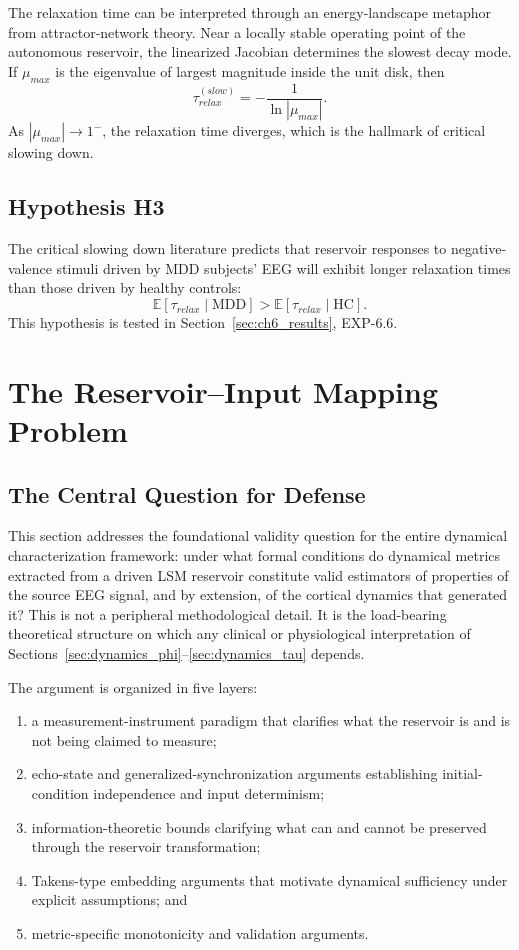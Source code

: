 The relaxation time can be interpreted through an energy-landscape metaphor from attractor-network theory. Near a locally stable operating point of the autonomous reservoir, the linearized Jacobian determines the slowest decay mode. If $\mu_{max}$ is the eigenvalue of largest magnitude inside the unit disk, then
\begin{equation}
\tau_{relax}^{(slow)} = -\frac{1}{\ln|\mu_{max}|}.
\end{equation}
As $|\mu_{max}|\rightarrow 1^{-}$, the relaxation time diverges, which is the hallmark of critical slowing down.

\subsection{Hypothesis H3}
The critical slowing down literature predicts that reservoir responses to negative-valence stimuli driven by MDD subjects' EEG will exhibit longer relaxation times than those driven by healthy controls:
\begin{equation}
\mathbb{E}[\tau_{relax}\mid \mathrm{MDD}] > \mathbb{E}[\tau_{relax}\mid \mathrm{HC}].
\end{equation}
This hypothesis is tested in Section~\ref{sec:ch6_results}, EXP-6.6.

\section{The Reservoir--Input Mapping Problem}
\label{sec:dynamics_fidelity}

\subsection{The Central Question for Defense}

This section addresses the foundational validity question for the entire dynamical characterization framework: under what formal conditions do dynamical metrics extracted from a driven LSM reservoir constitute valid estimators of properties of the source EEG signal, and by extension, of the cortical dynamics that generated it? This is not a peripheral methodological detail. It is the load-bearing theoretical structure on which any clinical or physiological interpretation of Sections~\ref{sec:dynamics_phi}--\ref{sec:dynamics_tau} depends.

The argument is organized in five layers:
\begin{enumerate}
    \item a measurement-instrument paradigm that clarifies what the reservoir is and is not being claimed to measure;
    \item echo-state and generalized-synchronization arguments establishing initial-condition independence and input determinism;
    \item information-theoretic bounds clarifying what can and cannot be preserved through the reservoir transformation;
    \item Takens-type embedding arguments that motivate dynamical sufficiency under explicit assumptions; and
    \item metric-specific monotonicity and validation arguments.
\end{enumerate}

